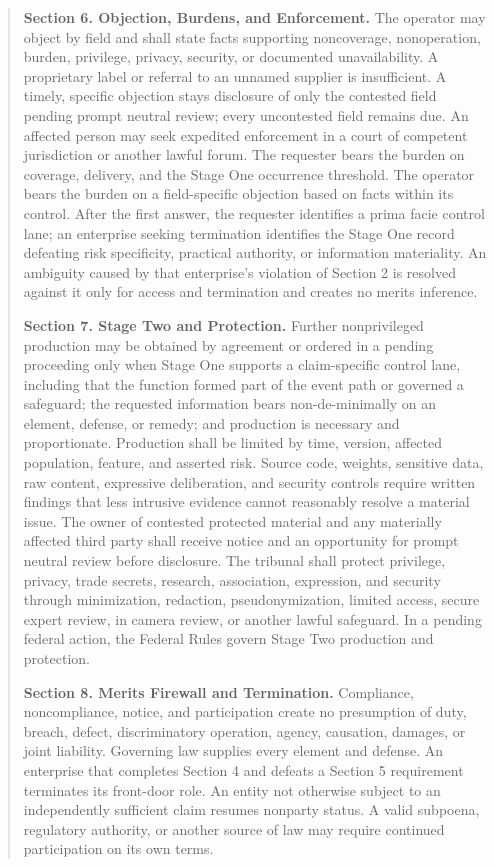 \begin{quote}
\textbf{Section 6. Objection, Burdens, and Enforcement.} The operator may object by field and shall state facts supporting noncoverage, nonoperation, burden, privilege, privacy, security, or documented unavailability. A proprietary label or referral to an unnamed supplier is insufficient. A timely, specific objection stays disclosure of only the contested field pending prompt neutral review; every uncontested field remains due. An affected person may seek expedited enforcement in a court of competent jurisdiction or another lawful forum. The requester bears the burden on coverage, delivery, and the Stage One occurrence threshold. The operator bears the burden on a field-specific objection based on facts within its control. After the first answer, the requester identifies a prima facie control lane; an enterprise seeking termination identifies the Stage One record defeating risk specificity, practical authority, or information materiality. An ambiguity caused by that enterprise's violation of Section 2 is resolved against it only for access and termination and creates no merits inference.

\textbf{Section 7. Stage Two and Protection.} Further nonprivileged production may be obtained by agreement or ordered in a pending proceeding only when Stage One supports a claim-specific control lane, including that the function formed part of the event path or governed a safeguard; the requested information bears non-de-minimally on an element, defense, or remedy; and production is necessary and proportionate. Production shall be limited by time, version, affected population, feature, and asserted risk. Source code, weights, sensitive data, raw content, expressive deliberation, and security controls require written findings that less intrusive evidence cannot reasonably resolve a material issue. The owner of contested protected material and any materially affected third party shall receive notice and an opportunity for prompt neutral review before disclosure. The tribunal shall protect privilege, privacy, trade secrets, research, association, expression, and security through minimization, redaction, pseudonymization, limited access, secure expert review, in camera review, or another lawful safeguard. In a pending federal action, the Federal Rules govern Stage Two production and protection.

\textbf{Section 8. Merits Firewall and Termination.} Compliance, noncompliance, notice, and participation create no presumption of duty, breach, defect, discriminatory operation, agency, causation, damages, or joint liability. Governing law supplies every element and defense. An enterprise that completes Section 4 and defeats a Section 5 requirement terminates its front-door role. An entity not otherwise subject to an independently sufficient claim resumes nonparty status. A valid subpoena, regulatory authority, or another source of law may require continued participation on its own terms.


\end{quote}
